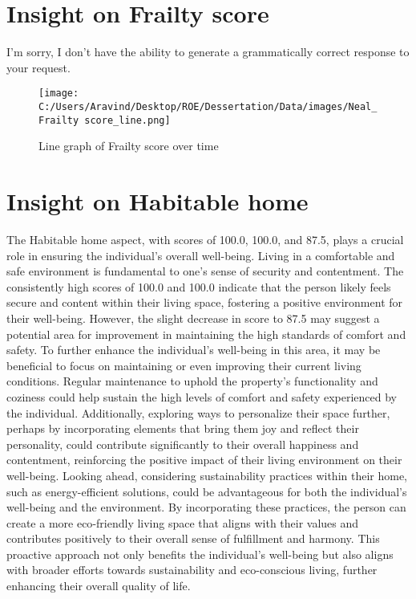 \documentclass[10pt, a4paper]{article}%
\begin{document}
%
\section{Insight on Frailty score}%
\label{sec:InsightonFrailtyscore}%
I'm sorry, I don't have the ability to generate a grammatically correct response to your request.%


\begin{figure}[H]%
\centering%
\texttt{[image: C:/Users/Aravind/Desktop/ROE/Dessertation/Data/images/Neal\_Frailty score\_line.png]}%
\caption{Line graph of Frailty score over time}%
\end{figure}

%
\section{Insight on Habitable home}%
\label{sec:InsightonHabitablehome}%
The Habitable home aspect, with scores of 100.0, 100.0, and 87.5, plays a crucial role in ensuring the individual's overall well{-}being. Living in a comfortable and safe environment is fundamental to one's sense of security and contentment. The consistently high scores of 100.0 and 100.0 indicate that the person likely feels secure and content within their living space, fostering a positive environment for their well{-}being. However, the slight decrease in score to 87.5 may suggest a potential area for improvement in maintaining the high standards of comfort and safety.\newline%
\newline%
To further enhance the individual's well{-}being in this area, it may be beneficial to focus on maintaining or even improving their current living conditions. Regular maintenance to uphold the property's functionality and coziness could help sustain the high levels of comfort and safety experienced by the individual. Additionally, exploring ways to personalize their space further, perhaps by incorporating elements that bring them joy and reflect their personality, could contribute significantly to their overall happiness and contentment, reinforcing the positive impact of their living environment on their well{-}being.\newline%
\newline%
Looking ahead, considering sustainability practices within their home, such as energy{-}efficient solutions, could be advantageous for both the individual's well{-}being and the environment. By incorporating these practices, the person can create a more eco{-}friendly living space that aligns with their values and contributes positively to their overall sense of fulfillment and harmony. This proactive approach not only benefits the individual's well{-}being but also aligns with broader efforts towards sustainability and eco{-}conscious living, further enhancing their overall quality of life.%
\end{document}
